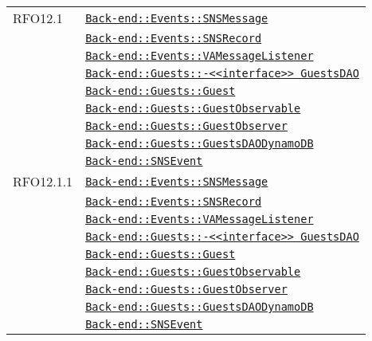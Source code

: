 \begin{longtable}{|>{\centering}m{3cm}|m{10cm}<{\centering}|}
RFO12.1 & \hyperref[Back-end::Events::SNSMessage]{\texttt{Back-end::Events::SNSMessage}}\\
& \hyperref[Back-end::Events::SNSRecord]{\texttt{Back-end::Events::SNSRecord}}\\
& \hyperref[Back-end::Events::VAMessageListener]{\texttt{Back-end::Events::VAMessageListener}}\\
& \hyperref[Back-end::Guests::<<interface>> GuestsDAO]{\texttt{Back-end::Guests::-\linebreak <<interface>> GuestsDAO}}\\
& \hyperref[Back-end::Guests::Guest]{\texttt{Back-end::Guests::Guest}}\\
& \hyperref[Back-end::Guests::GuestObservable]{\texttt{Back-end::Guests::GuestObservable}}\\
& \hyperref[Back-end::Guests::GuestObserver]{\texttt{Back-end::Guests::GuestObserver}}\\
& \hyperref[Back-end::Guests::GuestsDAODynamoDB]{\texttt{Back-end::Guests::GuestsDAODynamoDB}}\\
& \hyperref[Back-end::SNSEvent]{\texttt{Back-end::SNSEvent}}\\ \hline

RFO12.1.1 & \hyperref[Back-end::Events::SNSMessage]{\texttt{Back-end::Events::SNSMessage}}\\
& \hyperref[Back-end::Events::SNSRecord]{\texttt{Back-end::Events::SNSRecord}}\\
& \hyperref[Back-end::Events::VAMessageListener]{\texttt{Back-end::Events::VAMessageListener}}\\
& \hyperref[Back-end::Guests::<<interface>> GuestsDAO]{\texttt{Back-end::Guests::-\linebreak <<interface>> GuestsDAO}}\\
& \hyperref[Back-end::Guests::Guest]{\texttt{Back-end::Guests::Guest}}\\
& \hyperref[Back-end::Guests::GuestObservable]{\texttt{Back-end::Guests::GuestObservable}}\\
& \hyperref[Back-end::Guests::GuestObserver]{\texttt{Back-end::Guests::GuestObserver}}\\
& \hyperref[Back-end::Guests::GuestsDAODynamoDB]{\texttt{Back-end::Guests::GuestsDAODynamoDB}}\\
& \hyperref[Back-end::SNSEvent]{\texttt{Back-end::SNSEvent}}\\ \hline


\end{longtable}
